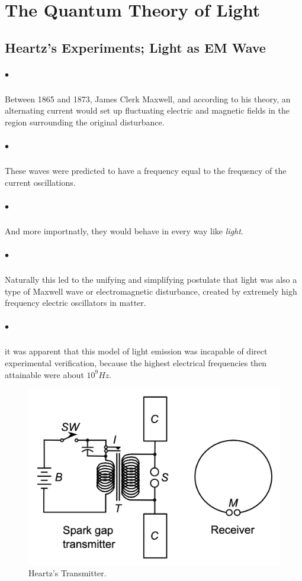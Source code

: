 \chapter{The Quantum Theory of Light}
\section{Heartz's Experiments; Light as EM Wave}
    
    \paragraph{$\bullet$} Between 1865 and 1873, James Clerk Maxwell, and according to his theory, 
    an alternating current would set up fluctuating electric and magnetic fields in the 
    region surrounding the original disturbance.
    \paragraph{$\bullet$} These waves were predicted to have a frequency equal to the frequency of the current oscillations.
    \paragraph{$\bullet$} And more importnatly, they would behave in every way like \textit{light}.
    \paragraph{$\bullet$} Naturally this led to the unifying and simplifying postulate that light was also a 
    type of Maxwell wave or electromagnetic disturbance, created by extremely high frequency electric oscillators in matter.
    \paragraph{$\bullet$} it was apparent that this model of light emission was incapable of direct experimental 
    verification, because the highest electrical frequencies then attainable were about $10^9Hz$.

    \begin{figure}
        \includegraphics[width=0.9\linewidth]{figures/Hertz_transmitter.png}
        \caption{Heartz's Transmitter.}
        \label{fig:heartz's transmitter}
    \end{figure}


